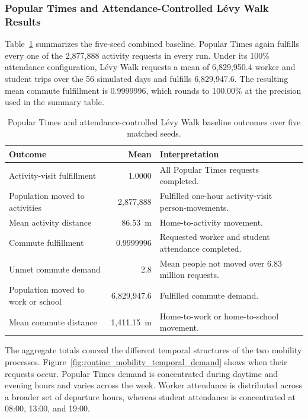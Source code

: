 \subsubsection{Popular Times and Attendance-Controlled L\'evy Walk Results}

Table~\ref{tbl:levy_attendance_baseline} summarizes the five-seed combined baseline. Popular Times again fulfills every one of the 2,877,888 activity requests in every run. Under its 100\% attendance configuration, L\'evy Walk requests a mean of 6,829,950.4 worker and student trips over the 56 simulated days and fulfills 6,829,947.6. The resulting mean commute fulfillment is 0.9999996, which rounds to 100.00\% at the precision used in the summary table.

\begin{table}[ht]
\centering
\footnotesize
\caption{Popular Times and attendance-controlled L\'evy Walk baseline outcomes over five matched seeds.}
\label{tbl:levy_attendance_baseline}
\begin{tabularx}{\linewidth}{@{}lrX@{}}
\toprule
\textbf{Outcome} & \textbf{Mean} & \textbf{Interpretation} \\
\midrule
Activity-visit fulfillment
    & 1.0000
    & All Popular Times requests completed. \\
Population moved to activities
    & 2,877,888
    & Fulfilled one-hour activity-visit person-movements. \\
Mean activity distance
    & 86.53~m
    & Home-to-activity movement. \\
Commute fulfillment
    & 0.9999996
    & Requested worker and student attendance completed. \\
Unmet commute demand
    & 2.8
    & Mean people not moved over 6.83 million requests. \\
Population moved to work or school
    & 6,829,947.6
    & Fulfilled commute demand. \\
Mean commute distance
    & 1,411.15~m
    & Home-to-work or home-to-school movement. \\
\bottomrule
\end{tabularx}
\end{table}

The aggregate totals conceal the different temporal structures of the two mobility processes. Figure~\ref{fig:routine_mobility_temporal_demand} shows when their requests occur. Popular Times demand is concentrated during daytime and evening hours and varies across the week. Worker attendance is distributed across a broader set of departure hours, whereas student attendance is concentrated at 08:00, 13:00, and 19:00.

